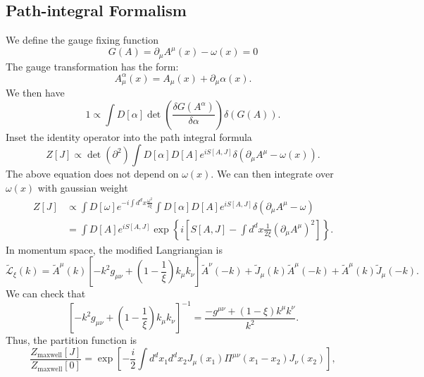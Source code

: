 \subsection{Path-integral Formalism}
We define the gauge fixing function
\begin{equation*}
	G(A) = \partial_\mu A^\mu(x) -\omega(x) = 0
\end{equation*}
The gauge transformation has the form:
\begin{equation*}
	A^\alpha_\mu(x) = A_\mu(x) + \partial_\mu \alpha(x).
\end{equation*}
We then have
\begin{equation*}
	1 \propto \int D[\alpha] \det\left(\frac{\delta G(A^\alpha)}{\delta \alpha}\right) \delta(G(A)).
\end{equation*}
Inset the identity operator into the path integral formula
\begin{equation*}
	Z[J] \propto \det\left(\partial^2 \right) \int D[\alpha]D[A] e^{iS[A,J]} \delta(\partial_\mu A^\mu -\omega(x)).
\end{equation*}
The above equation does not depend on $\omega(x)$.
We can then integrate over $\omega(x)$ with gaussian weight
\begin{equation*}
\begin{aligned}
	Z[J] &\propto \int D[\omega] e^{-i\int d^d x \frac{\omega^2}{2\xi}} \int D[\alpha]D[A] e^{iS[A,J]}
	\delta(\partial_\mu A^\mu-\omega) \\
	&= \int D[A] e^{iS[A,J]} \exp\left\{i \left[S[A,J]-\int d^d x \frac{1}{2\xi}(\partial_\mu A^\mu)^2 \right]\right\}.
\end{aligned}
\end{equation*}
In momentum space, the modified Langriangian is 
\begin{equation*}
	\tilde{\mathcal{L}}_\xi(k) = \tilde{A}^\mu(k)\left[
		-k^2 g_{\mu\nu}+\left(1-\frac{1}{\xi}\right)k_\mu k_\nu
		\right] \tilde{A}^\nu(-k) +
		\tilde{J}_\mu(k) \tilde{A}^\mu(-k) +
		\tilde{A}^\mu(k) \tilde{J}_\mu(-k).
\end{equation*}
We can check that
\begin{equation}
	\left[-k^2 g_{\mu\nu}+\left(1-\frac{1}{\xi}\right)k_\mu k_\nu\right]^{-1}
	= \frac{-g^{\mu\nu}+(1-\xi)k^\mu k^\nu}{k^2}.
\end{equation}
Thus, the partition function is
\begin{equation}
	\frac{Z_{\mathrm{maxwell}}[J]}{Z_{\mathrm{maxwell}}[0]}
	= \exp\left[-\frac{i}{2}\int d^dx_1 d^dx_2 J_\mu(x_1) \Pi^{\mu\nu}(x_1-x_2) J_\nu(x_2) \right],
\end{equation}
